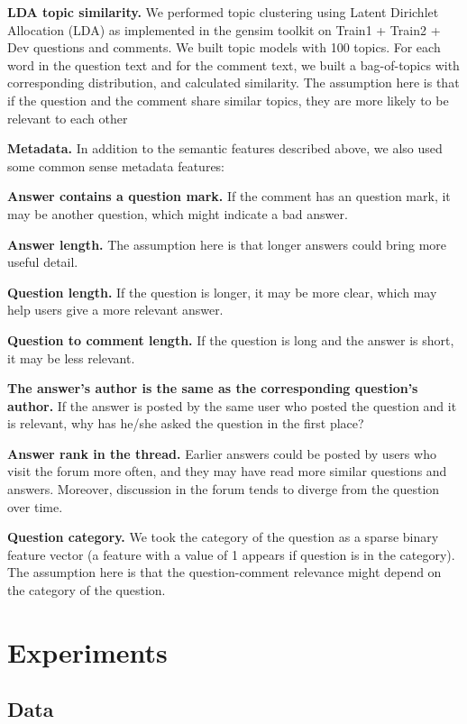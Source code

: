 \documentclass[12pt, a4paper, oneside]{Thesis} %
\newcommand{\mychapter}[2]{
    \setcounter{chapter}{#1}
    \setcounter{section}{0}
    \chapter*{#2}
    \addcontentsline{toc}{chapter}{#2}
    \lhead{\emph{#2}}
}
\begin{document}
\textbf{LDA topic similarity.} We performed topic clustering using Latent Dirichlet Allocation (LDA) as implemented in the gensim toolkit \cite{rehurek2010software} on Train1 + Train2 + Dev questions and comments. We built topic models with 100 topics. For each word in the question text and for the comment text, we built a bag-of-topics with corresponding distribution, and calculated similarity. The assumption here is that if the question and the comment share similar topics, they are more likely to be relevant to each other


\textbf{Metadata.} In addition to the semantic features described above, we also used some common sense metadata features:

\textbf{Answer contains a question mark.} If the comment has an question mark, it may be another question, which might indicate a bad answer.

\textbf{Answer length.} The assumption here is that longer answers could bring more useful detail.

\textbf{Question length.} If the question is longer, it may be more clear, which may help users give a more relevant answer.

\textbf{Question to comment length.} If the question is long and the answer is short, it may be less relevant.

\textbf{The answer’s author is the same as the corresponding question’s author.} If the answer is posted by the same user who posted the question and it is relevant, why has he/she asked the question in the first place?

\textbf{Answer rank in the thread.} Earlier answers could be posted by users who visit the forum more often, and they may have read more similar questions and answers. Moreover, discussion in the forum tends to diverge from the question over time.

\textbf{Question category.} We took the category of the question as a sparse binary feature vector (a feature with a value of 1 appears if question is in the category). The assumption here is that the question-comment relevance might depend on the category of the question.


\mychapter{4}{Experiments}

\section{Data}
\end{document}
